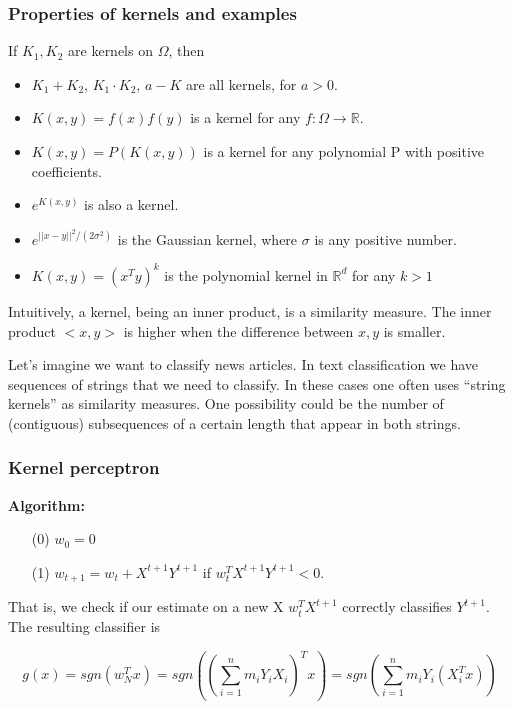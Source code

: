 \documentclass[11pt, english]{article}
\begin{document}
\subsubsection{Properties of kernels and examples}

If $K_1, K_2$ are kernels on $\Omega$, then 
\begin{itemize}
	\item $K_1 + K_2$, $K_1 \cdot K_2$, $a - K$ are all kernels, for $a>0$.
	\item $K(x,y) = f(x)f(y)$ is a kernel for any $f: \Omega \rightarrow \mathbb{R}$.
	\item $K(x,y) = P(K(x,y))$ is a kernel for any polynomial P with positive coefficients.
	\item $e^{K(x,y)}$ is also a kernel.
	\item $e^{||x-y||^2 /(2\sigma^2)}$ is the Gaussian kernel, where $\sigma$ is any positive number.
	\item $K(x,y) = (x^Ty)^k$ is the polynomial kernel in $\mathbb{R}^d$ for any $k>1$
\end{itemize}

Intuitively, a kernel, being an inner product, is a similarity measure. The inner product $<x,y>$ is higher when the difference between $x,y$ is smaller.

Let's imagine we want to classify news articles. In text classification we have sequences of strings that we need to classify. In these cases one often uses ``string kernels'' as similarity measures. One possibility could be the number of (contiguous) subsequences of a certain length that appear in both strings.

\subsubsection{Kernel perceptron}

\textbf{Algorithm:}
\begin{enumerate}
	\item[(0)] $w_0 = 0$
	\item[(1)] $w_{t+1} = w_t + X^{t+1}Y^{t+1}$ if $w^T_t X^{t+1}Y^{t+1}<0$. 
\end{enumerate}

That is, we check if our estimate on a new X $w^T_t X^{t+1}$ correctly classifies $Y^{t+1}$. The resulting classifier is

\begin{equation}
g(x) = sgn(w_N^T x) = sgn((\sum_{i=1}^{n} m_i Y_i X_i)^T x) = sgn(\sum_{i=1}^{n}m_i Y_i(X_i^Tx))
\end{equation}
\end{document}
